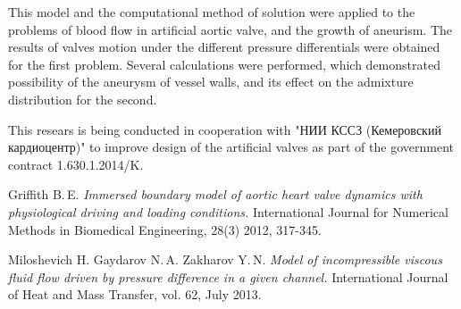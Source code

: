 \documentclass[12pt,a4paper,twoside]{article}
\begin{document}
This model and the computational method of solution were applied to the problems of blood flow in artificial aortic valve, and the growth of aneurism. The results of valves motion under the different pressure differentials were obtained for the first problem. Several calculations were performed, which demonstrated possibility of the aneurysm of vessel walls, and its effect on the admixture distribution for the second.

This resears is being conducted in cooperation with "НИИ КССЗ (Кемеровский кардиоцентр)" to improve design of the artificial valves as part of the government contract 1.630.1.2014/K.

\begin{thebibliography}{9}
     Griffith B.\,E. {\em Immersed boundary model of aortic heart valve dynamics with physiological driving and loading conditions.} International Journal for Numerical Methods in Biomedical Engineering, 28(3) 2012, 317-345.

	 Miloshevich H. Gaydarov N.\,A. Zakharov Y.\,N. {\em Model of incompressible viscous fluid flow driven by  pressure difference in a given channel.} International Journal of Heat and Mass Transfer, vol. 62, July 2013.

\end{thebibliography}
\end{document}
